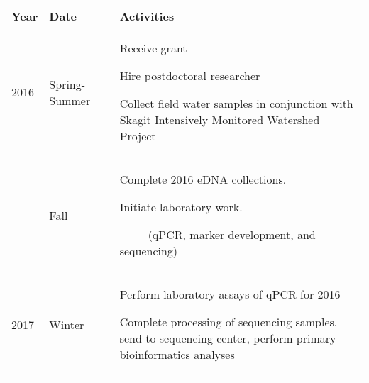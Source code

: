 \documentclass[]{article}
\begin{document}
\begin{longtable}[]{@{}lll@{}}
\toprule
\begin{minipage}[t]{0.30\columnwidth}\raggedright\strut
\textbf{Year}\strut
\end{minipage} & \begin{minipage}[t]{0.30\columnwidth}\raggedright\strut
\textbf{Date}\strut
\end{minipage} & \begin{minipage}[t]{0.30\columnwidth}\raggedright\strut
\textbf{Activities}\strut
\end{minipage}\tabularnewline
\begin{minipage}[t]{0.32\columnwidth}\raggedright\strut
2016\strut
\end{minipage} & \begin{minipage}[t]{0.32\columnwidth}\raggedright\strut
Spring-Summer{~}\strut
\end{minipage} & \begin{minipage}[t]{0.32\columnwidth}\raggedright\strut
Receive grant{~}

Hire postdoctoral researcher

Collect field water samples in conjunction with Skagit Intensively
Monitored Watershed Project\strut
\end{minipage}\tabularnewline
\begin{minipage}[t]{0.32\columnwidth}\raggedright\strut
\strut
\end{minipage} & \begin{minipage}[t]{0.32\columnwidth}\raggedright\strut
Fall{~}\strut
\end{minipage} & \begin{minipage}[t]{0.32\columnwidth}\raggedright\strut
Complete 2016 eDNA collections.

Initiate laboratory work.

{~ ~ ~ }(qPCR, marker development, and sequencing)\strut
\end{minipage}\tabularnewline
\begin{minipage}[t]{0.32\columnwidth}\raggedright\strut
2017\strut
\end{minipage} & \begin{minipage}[t]{0.32\columnwidth}\raggedright\strut
Winter{~}\strut
\end{minipage} & \begin{minipage}[t]{0.32\columnwidth}\raggedright\strut
Perform laboratory assays of qPCR for 2016{~}

Complete processing of sequencing samples, send to sequencing center,
perform primary bioinformatics analyses


\end{minipage}
\end{longtable}
\end{document}
